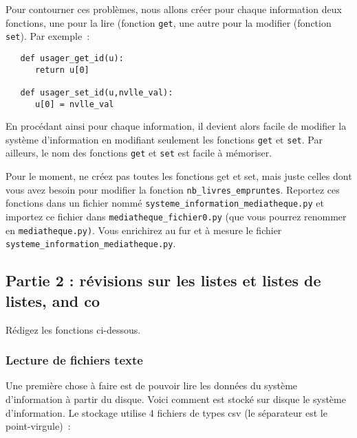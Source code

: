 \documentclass[10pt,a4paper,onecolumn]{article}
\begin{document}
Pour contourner ces problèmes, nous allons créer pour chaque information deux fonctions, une pour la lire (fonction \texttt{get}, une autre pour la modifier (fonction \texttt{set}). Par exemple~:

\begin{verbatim}
   def usager_get_id(u):
      return u[0]

   def usager_set_id(u,nvlle_val):
      u[0] = nvlle_val
\end{verbatim}

En procédant ainsi pour chaque information, il devient alors facile de modifier la système d'information en modifiant seulement les fonctions \texttt{get} et \texttt{set}. Par ailleurs, le nom des fonctions \texttt{get} et \texttt{set} est facile à mémoriser.

Pour le moment, ne créez pas toutes les fonctions get et set, mais juste celles dont vous avez besoin pour modifier la fonction \texttt{nb\_livres\_empruntes}. Reportez ces fonctions dans un fichier nommé \texttt{systeme\_information\_mediatheque.py} et importez ce fichier dans \texttt{mediatheque\_fichier0.py} (que vous pourrez renommer en \texttt{mediatheque.py)}. Vous enrichirez au fur et à mesure le fichier \texttt{systeme\_information\_mediatheque.py}.

\subsection{Partie 2 : révisions sur les listes et listes de listes, and co}

Rédigez les fonctions ci-dessous.


\subsubsection{Lecture de fichiers texte}

Une première chose à faire est de pouvoir lire les données du système d'information à partir du disque. Voici comment est stocké sur disque le système d'information. Le stockage utilise 4 fichiers de types csv (le séparateur est le point-virgule)~:
\end{document}
